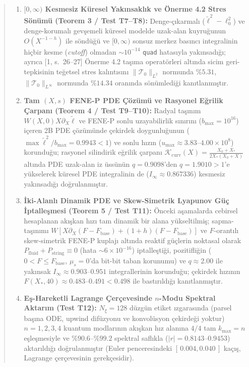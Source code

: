 \documentclass[12pt,a4paper]{article}
\begin{document}
\begin{abstract}
\begin{enumerate}
    \item \textbf{$[0,\infty)$ Kesmesiz Küresel Yakınsaklık ve Önerme 4.2 Stres Sönümü (Teorem 3 / Test T7--T8):} Denge-çıkarmalı ($\tilde{\ell}^2 - \ell_0^2$) ve denge-korumalı gevşemeli küresel modelde uzak-alan kuyruğunun $O(X^{-1-h})$ ile söndüğü ve $[0,\infty)$ sonsuz merkez basıncı integralinin hiçbir kesme (\textit{cutoff}) olmadan $\sim 10^{-14}$ \texttt{quad} hatasıyla yakınsadığı; ayrıca [1, s.\ 26--27] Önerme 4.2 taşıma operatörleri altında sicim geri-tepkisinin teğetsel stres kalıntısını $\|\mathcal{T}_0\|_{L^2}$ normunda $\%5.31$, $\|\mathcal{T}_0\|_{L^\infty}$ normunda $\%14.34$ oranında sönümlediği kanıtlanmıştır.
    \item \textbf{Tam $(X,s)$ FENE-P PDE Çözümü ve Rasyonel Eğrilik Çarpanı (Teorem 4 / Test T9--T10):} Radyal taşınım $W(X,0)X\partial_X\tilde{\ell}$ ve FENE-P sonlu uzayabilirlik sınırını ($b_{\max}=10^{16}$) içeren 2B PDE çözümünde çekirdek doygunluğunun ($\max\tilde{\ell}^2/b_{\max} = 0.9943 < 1$) ve sonlu hızın ($u_{\max} \approx 3.83\text{--}4.00\times 10^8$) korunduğu; rasyonel silindirik eğrilik çarpanı $\mathcal{K}_{\mathrm{curv}}(X) = \frac{X_0+X_*}{2X_*(X_0+X)}$ altında PDE uzak-alan iz üssünün $q = 0.9098$'den $q = 1.9010 > 1$'e yükselerek küresel PDE integralinin de ($I_\infty \approx 0.867336$) kesmesiz yakınsadığı doğrulanmıştır.
    \item \textbf{İki-Alanlı Dinamik PDE ve Skew-Simetrik Lyapunov Güç İptalleşmesi (Teorem 5 / Test T11):} Önceki aşamalarda cebirsel hesaplanan akışkan hızı tam dinamik bir alana yükseltilmiş; sapma-taşınımı $W[X\partial_X(F-F_{\mathrm{base}}) + (1+h)(F-F_{\mathrm{base}})]$ ve $F$-orantılı skew-simetrik FENE-P kuplajı altında reaktif güçlerin noktasal olarak $P_{\mathrm{fluid}} + P_{\mathrm{string}} \equiv 0$ (hata $\sim 6 \times 10^{-16}$) iptalleştiği, pozitifliğin ($0 < F \le F_{\mathrm{base}}$, $\mu_s=0$'da bit-bit taban korunumu) ve $q \approx 2.00$ ile yakınsak $I_\infty \approx 0.903\text{--}0.951$ integrallerinin korunduğu; çekirdek hızının $F(X_*,40) \approx 0.483\text{--}0.491 < 0.498$ ile bastırıldığı kanıtlanmıştır.
    \item \textbf{Eş-Hareketli Lagrange Çerçevesinde $n$-Modu Spektral Aktarım (Test T12):} $N_\xi = 128$ düzgün etiket ızgarasında (parsel başına ODE, upwind difüzyonu ve konvolüsyon çekirdeği yoktur) $n = 1, 2, 3, 4$ kuantum modlarının akışkan hız alanına $4/4$ tam $k_{\max} = n$ eşleşmesiyle ve $\%90.6\text{--}\%99.2$ spektral saflıkla ($|r| = 0.8143\text{--}0.9453$) aktarıldığı doğrulanmıştır (Euler penceresindeki $[\,0.004, 0.040\,]$ kaçış, Lagrange çerçevesinin gerekçesidir).
\end{enumerate}
\end{abstract}
\end{document}
